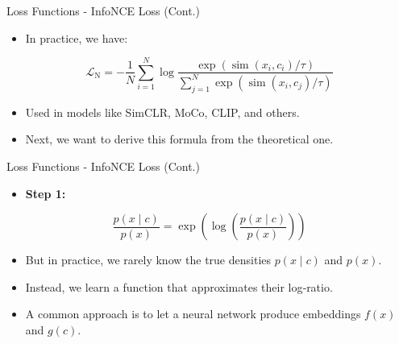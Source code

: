 \documentclass[serif, aspectratio=169]{beamer}
\begin{document}
\begin{frame}{Loss Functions - InfoNCE Loss (Cont.)}
     \begin{itemize}
         \item In practice, we have:
     \end{itemize}

     \begin{equation*}
         \mathcal{L}_{\mathrm{N}}=-\frac{1}{N} \sum_{i=1}^N \log \frac{\exp \left(\operatorname{sim}\left(x_i, c_i\right) / \tau\right)}{\sum_{j=1}^N \exp \left(\operatorname{sim}\left(x_i, c_j\right) / \tau\right)}
     \end{equation*}

     \begin{itemize}
         \item Used in models like SimCLR, MoCo, CLIP, and others.
         \item Next, we want to derive this formula from the theoretical one.
     \end{itemize}
\end{frame}


\begin{frame}{Loss Functions - InfoNCE Loss (Cont.)}
    \begin{itemize}
         \item \textbf{Step 1:}
     \end{itemize}

     \begin{equation*}
         \frac{p\left(x \mid c\right)}{p\left(x\right)} =
         \exp\left(\log \left(\frac{p\left(x \mid c\right)}{p\left(x\right)}\right) \right)
     \end{equation*}

     \begin{itemize}
         \item But in practice, we rarely know the true densities $p\left(x \mid c\right)$ and $p\left(x\right)$.
         \item Instead, we learn a function that approximates their log‐ratio.
         \item A common approach is to let a neural network produce embeddings $f\left(x\right)$ and $g\left(c\right)$.
     \end{itemize}
\end{frame}
\end{document}
